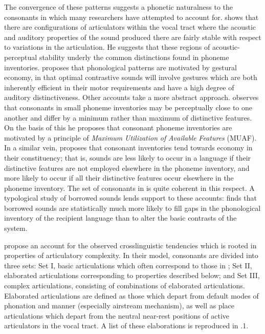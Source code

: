   The convergence of these patterns suggests a phonetic naturalness to the consonants in  which many researchers have attempted to account for. \citet{Stevens1989} shows that there are configurations of articulators within the vocal tract where the acoustic and auditory properties of the sound produced there are fairly stable with respect to variations in the articulation. He suggests that these regions of acoustic-perceptual stability underly the common distinctions found in phoneme inventories. \citet{Maddieson1996} proposes that phonological patterns are motivated by gestural economy, in that optimal contrastive sounds will involve gestures which are both inherently efficient in their motor requirements and have a high degree of auditory distinctiveness. Other accounts take a more abstract approach. \citet{Ohala1979} observes that consonants in small phoneme inventories may be perceptually close to one another and differ by a minimum rather than maximum of distinctive features. On the basis of this he proposes that consonant phoneme inventories are motivated by a principle of \textit{Maximum} \textit{Utilization} \textit{of} \textit{Available} \textit{Features} (MUAF). In a similar vein, \citet{Clements2003} proposes that consonant inventories tend towards economy in their constituency; that is, sounds are less likely to occur in a language if their distinctive features are not employed elsewhere in the phoneme inventory, and more likely to occur if all their distinctive features occur elsewhere in the phoneme inventory. The set of consonants in  is quite coherent in this respect. A typological study of borrowed sounds lends support to these accounts: \citet{Maddieson1985} finds that borrowed sounds are statistically much more likely to fill gaps in the phonological inventory of the recipient language than to alter the basic contrasts of the system.

  \citet{LindblomMaddieson1988} propose an account for the observed crosslinguistic tendencies which is rooted in properties of articulatory complexity. In their model, consonants are divided into three sets: Set I, basic articulations which often correspond to those in ; Set II, elaborated articulations corresponding to properties described below; and Set III, complex articulations, consisting of combinations of elaborated articulations. Elaborated articulations are defined as those which depart from default modes of phonation and manner (especially airstream mechanism), as well as place articulations which depart from the neutral near-rest positions of active articulators in the vocal tract. A list of these elaborations is reproduced in .1.

